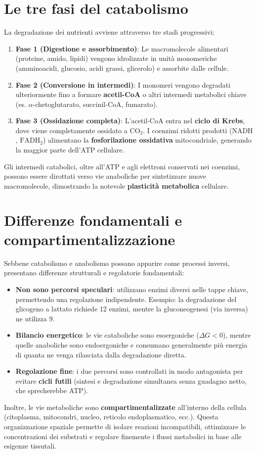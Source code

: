 \documentclass[12pt,a4paper]{report}
\begin{document}
\section{Le tre fasi del catabolismo}
La degradazione dei nutrienti avviene attraverso tre stadi progressivi:
\begin{enumerate}
\item \textbf{Fase 1 (Digestione e assorbimento)}: Le macromolecole alimentari (proteine, amido, lipidi) vengono idrolizzate in unità monomeriche (amminoacidi, glucosio, acidi grassi, glicerolo) e assorbite dalle cellule.
\item \textbf{Fase 2 (Conversione in intermedi)}: I monomeri vengono degradati ulteriormente fino a formare \textbf{acetil-CoA} o altri intermedi metabolici chiave (es. \(\alpha\)-chetoglutarato, succinil-CoA, fumarato).
\item \textbf{Fase 3 (Ossidazione completa)}: L'acetil-CoA entra nel \textbf{ciclo di Krebs}, dove viene completamente ossidato a \(\mathrm{CO_2}\). I coenzimi ridotti prodotti (\(\mathrm{NADH}\), \(\mathrm{FADH_2}\)) alimentano la \textbf{fosforilazione ossidativa} mitocondriale, generando la maggior parte dell'ATP cellulare.
\end{enumerate}
Gli intermedi catabolici, oltre all'ATP e agli elettroni conservati nei coenzimi, possono essere dirottati verso vie anaboliche per sintetizzare nuove macromolecole, dimostrando la notevole \textbf{plasticità metabolica} cellulare.

\section{Differenze fondamentali e compartimentalizzazione}
Sebbene catabolismo e anabolismo possano apparire come processi inversi, presentano differenze strutturali e regolatorie fondamentali:
\begin{itemize}
\item \textbf{Non sono percorsi speculari}: utilizzano enzimi diversi nelle tappe chiave, permettendo una regolazione indipendente. Esempio: la degradazione del glicogeno a lattato richiede 12 enzimi, mentre la gluconeogenesi (via inversa) ne utilizza 9.
\item \textbf{Bilancio energetico}: le vie cataboliche sono esoergoniche (\(\Delta G < 0\)), mentre quelle anaboliche sono endoergoniche e consumano generalmente più energia di quanta ne venga rilasciata dalla degradazione diretta.
\item \textbf{Regolazione fine}: i due percorsi sono controllati in modo antagonista per evitare \textbf{cicli futili} (sintesi e degradazione simultanea senza guadagno netto, che sprecherebbe ATP).
\end{itemize}
Inoltre, le vie metaboliche sono \textbf{compartimentalizzate} all'interno della cellula (citoplasma, mitocondri, nucleo, reticolo endoplasmatico, ecc.). Questa organizzazione spaziale permette di isolare reazioni incompatibili, ottimizzare le concentrazioni dei substrati e regolare finemente i flussi metabolici in base alle esigenze tissutali.
\end{document}
